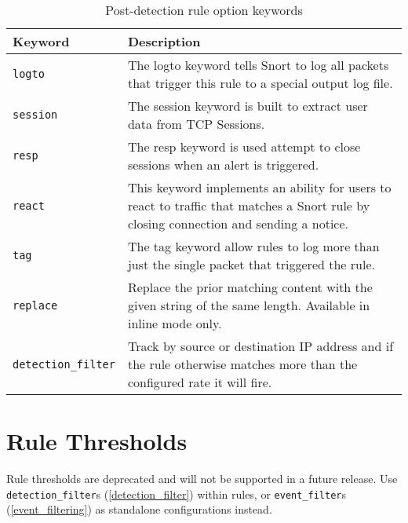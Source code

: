 \documentclass[english]{report}
\newenvironment{note}{
\samepage
    \vspace{10pt}{\textsf{
        {\hspace{7pt}\Huge{$\triangle$\hspace{-12.5pt}{\Large{$^!$}}}}\hspace{5pt}
        {\Large{NOTE}}
    }
    }
   \begin{center}
    \par\vspace{-17pt}

    \begin{lrbox}{\savepar}
    \begin{minipage}[r]{6in}
}
{
    \end{minipage}
    \end{lrbox}
    \fbox{
        \usebox{
            \savepar
	}
    }
    \par\vskip10pt
    \end{center}
}
\newenvironment{note}{
        \begin{rawhtml}
        <p><table border="1"><tr><td><b>
        Note:&nbsp;&nbsp;</b>
        \end{rawhtml}
}{
        \begin{rawhtml}
        </b></td></tr></table></p>
        \end{rawhtml}
}
\begin{document}
\begin{center}
\begin{longtable}[h]{| p{1in} | p{4.5in} |}
\caption{Post-detection rule option keywords} \\

\hline
Keyword & Description \\
\hline

\hline
\texttt{logto} &

The logto keyword tells Snort to log all packets that trigger this rule to a
special output log file. \\

\hline
\texttt{session} &

The session keyword is built to extract user data from TCP Sessions. \\

\hline
\texttt{resp} &

The resp keyword is used attempt to close sessions when an alert is triggered.
\\

\hline
\texttt{react} &

This keyword implements an ability for users to react to traffic that matches a
Snort rule by closing connection and sending a notice. \\

\hline
\texttt{tag} &

The tag keyword allow rules to log more than just the single packet that
triggered the rule. \\

\hline
\texttt{replace} & 

Replace the prior matching content with the given string of the same length.
Available in inline mode only.\\

\hline
\texttt{detection\_filter} & 

Track by source or destination IP address and if the rule otherwise matches
more than the configured rate it will fire.\\

\hline
\end{longtable}
\end{center}

\section{Rule Thresholds}

\begin{note}
Rule thresholds are deprecated and will not be supported in a future release.
Use \texttt{detection\_filter}s (\ref{detection_filter}) within rules, or
\texttt{event\_filter}s (\ref{event_filtering}) as standalone configurations
instead.
\end{note}
\end{document}
